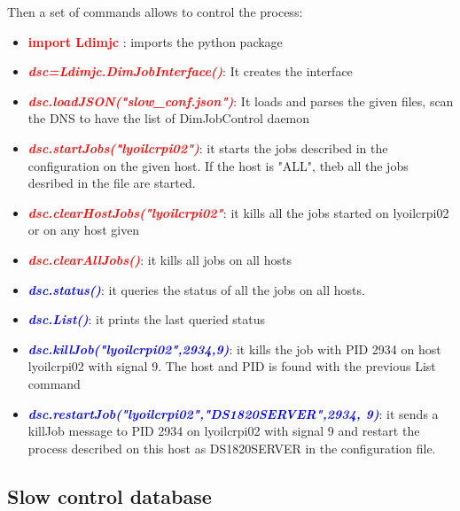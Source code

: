 \documentclass[english]{article}
\begin{document}
Then a set of commands allows to control the process:
\begin{itemize} 
\item \textcolor{red}{ \bf  import Ldimjc} :  imports the python package

\item \textcolor{red}{\it \bf dsc=Ldimjc.DimJobInterface()}: It creates the interface 

\item \textcolor{red}{\it \bf dsc.loadJSON("slow\_conf.json")}: It loads and parses the given files, scan the DNS to have the list of DimJobControl daemon   

\item \textcolor{red}{\it \bf dsc.startJobs("lyoilcrpi02")}: it starts the jobs described in the configuration on the given host. If the host is "ALL", theb all the jobs desribed in the file are started. 
\item \textcolor{red}{\it \bf dsc.clearHostJobs("lyoilcrpi02"}: it kills all the jobs started on lyoilcrpi02 or on any host given
 \item \textcolor{red}{\it \bf dsc.clearAllJobs()}: it kills all jobs on all hosts
\item \textcolor{blue}{\it \bf dsc.status()}: it queries the status of all the jobs on all hosts.
\item \textcolor{blue}{\it \bf dsc.List()}: it prints the last queried status
\item \textcolor{blue}{\it \bf dsc.killJob("lyoilcrpi02",2934,9)}: it kills the job with PID 2934 on host lyoilcrpi02 with signal 9. The host and PID is found with the previous List command

\item \textcolor{blue}{\it \bf dsc.restartJob("lyoilcrpi02","DS1820SERVER",2934, 9)}: it sends a killJob message to PID 2934 on lyoilcrpi02 with signal 9 and restart the process described on this host as DS1820SERVER in the configuration file.


\end{itemize} 
\subsection{Slow control database}
\end{document}
